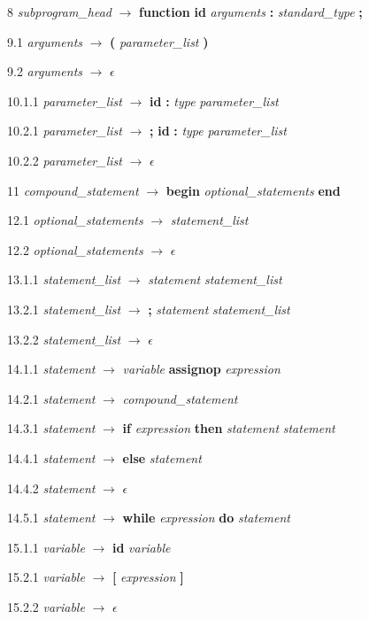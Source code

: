 8    \emph{subprogram\_head} $\rightarrow$ \textbf{function} \textbf{id} \emph{arguments} \textbf{:} \emph{standard\_type} \textbf{;}

9.1  \emph{arguments} $\rightarrow$ \textbf{(} \emph{parameter\_list} \textbf{)}

9.2  \emph{arguments} $\rightarrow$ $\epsilon$

10.1.1 \emph{parameter\_list} $\rightarrow$ \textbf{id} \textbf{:} \emph{type} \emph{parameter\_list\textprime}

10.2.1 \emph{parameter\_list\textprime} $\rightarrow$ \textbf{;} \textbf{id} \textbf{:} \emph{type} \emph{parameter\_list\textprime}

10.2.2 \emph{parameter\_list\textprime} $\rightarrow$ $\epsilon$

11   \emph{compound\_statement} $\rightarrow$ \textbf{begin} \emph{optional\_statements} \textbf{end}

12.1 \emph{optional\_statements} $\rightarrow$ \emph{statement\_list}

12.2 \emph{optional\_statements} $\rightarrow$ $\epsilon$

13.1.1 \emph{statement\_list} $\rightarrow$ \emph{statement} \emph{statement\_list\textprime}

13.2.1 \emph{statement\_list\textprime} $\rightarrow$ \textbf{;} \emph{statement} \emph{statement\_list\textprime}

13.2.2 \emph{statement\_list\textprime} $\rightarrow$ $\epsilon$

14.1.1 \emph{statement} $\rightarrow$ \emph{variable} \textbf{assignop} \emph{expression}

14.2.1 \emph{statement} $\rightarrow$ \emph{compound\_statement}

14.3.1 \emph{statement} $\rightarrow$ \textbf{if} \emph{expression} \textbf{then} \emph{statement} \emph{statement\textprime}

14.4.1 \emph{statement\textprime} $\rightarrow$ \textbf{else} \emph{statement}

14.4.2 \emph{statement\textprime} $\rightarrow$ $\epsilon$

14.5.1 \emph{statement} $\rightarrow$ \textbf{while} \emph{expression} \textbf{do} \emph{statement}

15.1.1 \emph{variable} $\rightarrow$ \textbf{id} \emph{variable\textprime}

15.2.1 \emph{variable\textprime} $\rightarrow$ \textbf{[} \emph{expression} \textbf{]}

15.2.2 \emph{variable\textprime} $\rightarrow$ $\epsilon$

